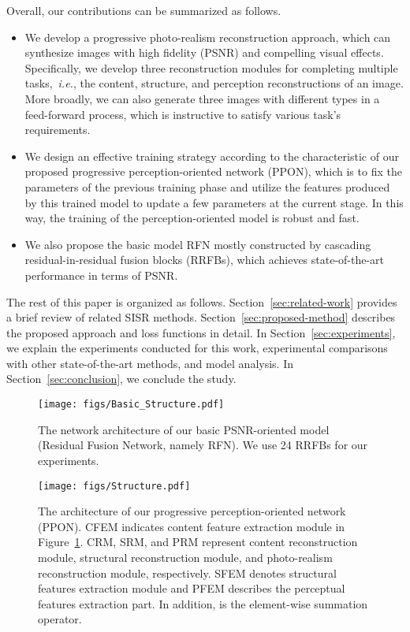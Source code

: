 \documentclass[preprint]{elsarticle}
\newcommand{\ie}{\textit{i.e.}}
\begin{document}
Overall, our contributions can be summarized as follows.
\begin{itemize}
	
	\item We develop a progressive photo-realism reconstruction approach, which can synthesize images with high fidelity (PSNR) and compelling visual effects. Specifically, we develop three reconstruction modules for completing multiple tasks,~\ie, the content, structure, and perception reconstructions of an image. More broadly, we can also generate three images with different types in a feed-forward process, which is instructive to satisfy various task's requirements.
	
	\item We design an effective training strategy according to the characteristic of our proposed progressive perception-oriented network (PPON), which is to fix the parameters of the previous training phase and utilize the features produced by this trained model to update a few parameters at the current stage. In this way, the training of the perception-oriented model is robust and fast.
	
	\item We also propose the basic model RFN mostly constructed by cascading residual-in-residual fusion blocks (RRFBs), which achieves state-of-the-art performance in terms of PSNR.
	
\end{itemize}
The rest of this paper is organized as follows. Section~\ref{sec:related-work} provides a brief review of related SISR methods. Section~\ref{sec:proposed-method} describes the proposed approach and loss functions in detail. In Section~\ref{sec:experiments}, we explain the experiments conducted for this work, experimental comparisons with other state-of-the-art methods, and model analysis. In Section~\ref{sec:conclusion}, we conclude the study.

\begin{figure}[htpb]
	\begin{center}
		\texttt{[image: figs/Basic\_Structure.pdf]}
	\end{center}
	\caption{The network architecture of our basic PSNR-oriented model (Residual Fusion Network, namely RFN). We use 24 RRFBs for our experiments.}
	\label{fig:basic_structure}
\end{figure}

\begin{figure}[htpb]
	\begin{center}
		\texttt{[image: figs/Structure.pdf]}
	\end{center}
	\caption{The architecture of our progressive perception-oriented network (PPON). CFEM indicates content feature extraction module in Figure~\ref{fig:basic_structure}. CRM, SRM, and PRM represent content reconstruction module, structural reconstruction module, and photo-realism reconstruction module, respectively. SFEM denotes structural features extraction module and PFEM describes the perceptual features extraction part. In addition,  is the element-wise summation operator.}
	\label{fig:architecture}
\end{figure}
\end{document}
